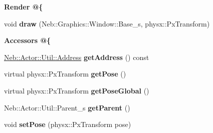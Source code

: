 \begin{Indent}{\bf \-Render @\{}\par
\begin{DoxyCompactItemize}
\item 
\hypertarget{classNeb_1_1Actor_1_1Base_aa7a1124c6d32fb41ecf26f2d7c2a486a}{void {\bfseries draw} (\-Neb\-::\-Graphics\-::\-Window\-::\-Base\-\_\-s, physx\-::\-Px\-Transform)}\label{classNeb_1_1Actor_1_1Base_aa7a1124c6d32fb41ecf26f2d7c2a486a}

\end{DoxyCompactItemize}
\end{Indent}
\begin{Indent}{\bf \-Accessors @\{}\par
\begin{DoxyCompactItemize}
\item 
\hypertarget{classNeb_1_1Actor_1_1Base_a3125fb49728707613266d4818df328cf}{\hyperlink{classNeb_1_1Actor_1_1Util_1_1Address}{\-Neb\-::\-Actor\-::\-Util\-::\-Address} {\bfseries get\-Address} () const }\label{classNeb_1_1Actor_1_1Base_a3125fb49728707613266d4818df328cf}

\item 
\hypertarget{classNeb_1_1Actor_1_1Base_aac89b4475a9443894c9814472702adcb}{virtual physx\-::\-Px\-Transform {\bfseries get\-Pose} ()}\label{classNeb_1_1Actor_1_1Base_aac89b4475a9443894c9814472702adcb}

\item 
\hypertarget{classNeb_1_1Actor_1_1Base_a76f34261b14ea648f42da355138efc9b}{virtual physx\-::\-Px\-Transform {\bfseries get\-Pose\-Global} ()}\label{classNeb_1_1Actor_1_1Base_a76f34261b14ea648f42da355138efc9b}

\item 
\hypertarget{classNeb_1_1Actor_1_1Base_a37766d7d2d3a32a90e4a81d039248588}{\-Neb\-::\-Actor\-::\-Util\-::\-Parent\-\_\-s {\bfseries get\-Parent} ()}\label{classNeb_1_1Actor_1_1Base_a37766d7d2d3a32a90e4a81d039248588}

\item 
\hypertarget{classNeb_1_1Actor_1_1Base_a98dd3ef316b4d28c5f36efa2d1e73966}{void {\bfseries set\-Pose} (physx\-::\-Px\-Transform pose)}\label{classNeb_1_1Actor_1_1Base_a98dd3ef316b4d28c5f36efa2d1e73966}

\end{DoxyCompactItemize}
\end{Indent}
